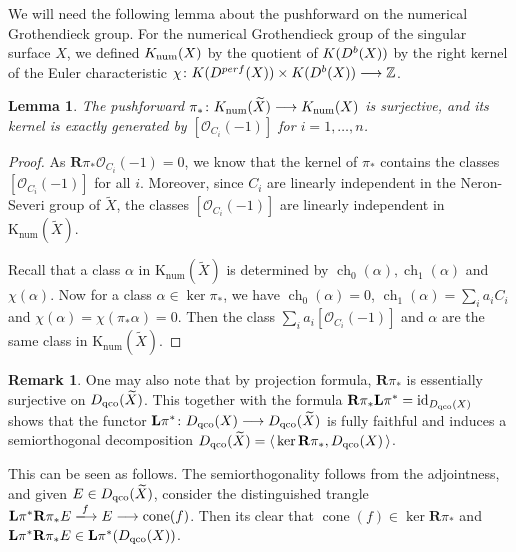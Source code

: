 \documentclass[12pt]{amsart}
\newtheorem{lemma}[theorem]{Lemma}
\theoremstyle{definition}
\newtheorem{remark}[theorem]{Remark}
\DeclareMathOperator{\cone}{cone}
\DeclareMathOperator{\id}{id}
\DeclareMathOperator{\qco}{qco}
\DeclareMathOperator{\num}{num}
\DeclareMathOperator{\ch}{ch}
\begin{document}
We will need the following lemma about the pushforward on the numerical Grothendieck group.
For the numerical Grothendieck group  of the singular surface $X$, we defined ${\rm K}_{\num}(X)$ by the quotient of ${\rm K}( \rm{D^b} (X))$ by the right kernel of the Euler characteristic 
$\chi \colon {\rm K}( \rm{D^{perf}}(X)) \times {\rm K}( \rm{D^b} (X)) \longrightarrow \mathbb{Z}$. 

\begin{lemma}\label{kernel}
The pushforward $\pi_\ast \colon {\rm K}_{\num}(\widetilde{X}) \longrightarrow {\rm K}_{\num}(X)$ is surjective, and its kernel is exactly generated by $[\mathcal{O}_{C_i}(-1)]$ for $i= 1, \dots, n$.
\end{lemma}
\begin{proof}
As $\mathbf{R}\pi_\ast \mathcal{O}_{C_i}(-1) = 0$, we know that the kernel of $\pi_\ast$ contains the classes $[\mathcal{O}_{C_i}(-1)]$ for all $i$.
Moreover, since $C_i$ are linearly independent in the Neron-Severi group of $\widetilde{X}$,
the classes $[\mathcal{O}_{C_i}(-1)]$ are linearly independent in $\mathrm{K}_{\num}(\widetilde X)$.

Recall that a class $\alpha$ in $\mathrm{K}_{\num}(\widetilde X)$ is determined by $\ch_0(\alpha), \ch_1(\alpha)$ and $\chi(\alpha)$.
Now for a class $\alpha \in \ker\pi_\ast$,
we have $\ch_0(\alpha)=0$, $\ch_1(\alpha)=\displaystyle \sum_i a_i C_i$ and $\chi(\alpha)=\chi(\pi_\ast \alpha)=0$.
Then the class $\displaystyle \sum_i a_i[\mathcal{O}_{C_i}(-1)]$ and $\alpha$ are the same class in $\mathrm{K}_{\num}(\widetilde X)$.
\end{proof}

\begin{remark}
One may also note that by projection formula,
$\mathbf{R}\pi_\ast$ is essentially surjective on ${\rm D}_{\qco}(\widetilde{X})$.
This together with the formula
$\mathbf{R}\pi_\ast \mathbf{L} \pi^\ast = \id_{{\rm D}_{\qco}(X)}$ shows that 
the functor $\mathbf{L}\pi^\ast \colon {\rm D}_{\qco}(X) \longrightarrow {\rm D}_{\qco}(\widetilde{X})$ is fully faithful and induces a semiorthogonal decomposition ${\rm D}_{\qco}(\widetilde{X}) =\langle \, \ker \mathbf{R}\pi_\ast, {\rm D}_{\qco}(X)  \, \rangle$.

This can be seen as follows. 
The semiorthogonality follows from the adjointness,
and given $E \in {\rm D}_{\qco}(\widetilde{X})$, consider the distinguished trangle $\mathbf{L}\pi^\ast \mathbf{R}\pi_\ast E \xlongrightarrow{f} E \longrightarrow \cone(f)$.
Then its clear that $\cone(f) \in \ker \mathbf{R}\pi_\ast$ and $\mathbf{L}\pi^\ast \mathbf{R}\pi_\ast E \in  \mathbf{L}\pi^\ast ({\rm D}_{\qco}(X))$.
\end{remark}
\end{document}
